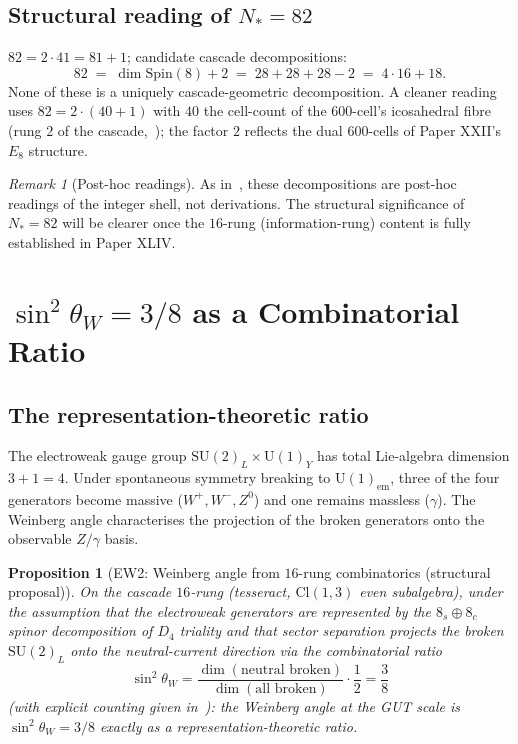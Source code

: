\documentclass[12pt]{article}
\newtheorem{proposition}[theorem]{Proposition}
\theoremstyle{definition}
\theoremstyle{remark}
\newtheorem{remark}[theorem]{Remark}
\begin{document}
\subsection{Structural reading of $N_* = 82$}

$82 = 2 \cdot 41 = 81 + 1$; candidate cascade decompositions:
\begin{equation}
82 \;=\; \dim \mathrm{Spin}(8) + 2 \;=\; 28 + 28 + 28 - 2 \;=\; 4 \cdot 16 + 18.
\end{equation}
None of these is a uniquely cascade-geometric decomposition. A cleaner reading uses $82 = 2 \cdot (40 + 1)$ with $40$ the cell-count of the 600-cell's icosahedral fibre (rung $2$ of the cascade,~\citep{SmartXXXV}); the factor $2$ reflects the dual 600-cells of Paper XXII's $E_8$ structure.

\begin{remark}[Post-hoc readings]
As in~\citep{SmartXXXVIII}, these decompositions are post-hoc readings of the integer shell, not derivations. The structural significance of $N_* = 82$ will be clearer once the $16$-rung (information-rung) content is fully established in Paper XLIV.
\end{remark}

\section{$\sin^2\theta_W = 3/8$ as a Combinatorial Ratio}\label{sec:weinberg}

\subsection{The representation-theoretic ratio}

The electroweak gauge group $\mathrm{SU}(2)_L \times \mathrm{U}(1)_Y$ has total Lie-algebra dimension $3 + 1 = 4$. Under spontaneous symmetry breaking to $\mathrm{U}(1)_{\mathrm{em}}$, three of the four generators become massive ($W^+, W^-, Z^0$) and one remains massless ($\gamma$). The Weinberg angle characterises the projection of the broken generators onto the observable $Z/\gamma$ basis.

\begin{proposition}[EW2: Weinberg angle from $16$-rung combinatorics (structural proposal)]\label{prop:weinberg}
On the cascade $16$-rung (tesseract, $\mathrm{Cl}(1,3)$ even subalgebra), under the assumption that the electroweak generators are represented by the $8_s \oplus 8_c$ spinor decomposition of $D_4$ triality and that sector separation projects the broken $\mathrm{SU}(2)_L$ onto the neutral-current direction via the combinatorial ratio
\begin{equation}\label{eq:weinberg-ratio}
\sin^2 \theta_W = \frac{\dim(\text{neutral broken})}{\dim(\text{all broken})} \cdot \frac{1}{2} = \frac{3}{8}
\end{equation}
(with explicit counting given in~\citep{SmartXXII}): the Weinberg angle at the GUT scale is $\sin^2 \theta_W = 3/8$ exactly as a representation-theoretic ratio.
\end{proposition}
\end{document}
